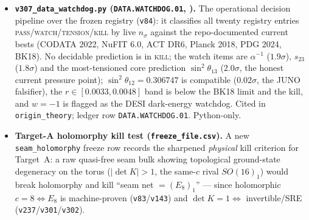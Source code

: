 \begin{itemize}
\item \textbf{\texttt{v307\_data\_watchdog.py} (\texttt{DATA.WATCHDOG.01}, \mE).} The operational decision pipeline over
  the frozen registry (\texttt{v84}): it classifies all twenty registry entries
  \textsc{pass}/\textsc{watch}/\textsc{tension}/\textsc{kill} by live $n_\sigma$ against the repo-documented current
  bests (CODATA 2022, NuFIT 6.0, ACT DR6, Planck 2018, PDG 2024, BK18). No decidable prediction is in \textsc{kill};
  the watch items are $\alpha^{-1}$ ($1.9\sigma$), $s_{23}$ ($1.8\sigma$) and the most-tensioned core prediction
  $\sin^2\theta_{13}$ ($2.0\sigma$, the honest current pressure point); $\sin^2\theta_{12}=0.306747$ is compatible
  ($0.02\sigma$, the JUNO falsifier), the $r\in[0.0033,0.0048]$ band is below the BK18 limit and the kill, and
  $w{=}{-}1$ is flagged as the DESI dark-energy watchdog. Cited in \texttt{origin\_theory}; ledger row
  \texttt{DATA.WATCHDOG.01}. Python-only.
\item \textbf{Target-A holomorphy kill test (\texttt{freeze\_file.csv}).} A new \texttt{seam\_holomorphy} freeze row
  records the sharpened \emph{physical} kill criterion for Target~A: a raw quasi-free seam bulk showing topological
  ground-state degeneracy on the torus ($|\det K|>1$, the same-$c$ rival $SO(16)_1$) would break holomorphy and kill
  ``seam net $=(E_8)_1$'' --- since holomorphic $c{=}8\Leftrightarrow E_8$ is machine-proven (\texttt{v83}/\texttt{v143})
  and $\det K{=}1\Leftrightarrow$ invertible/SRE (\texttt{v237}/\texttt{v301}/\texttt{v302}).
\end{itemize}

